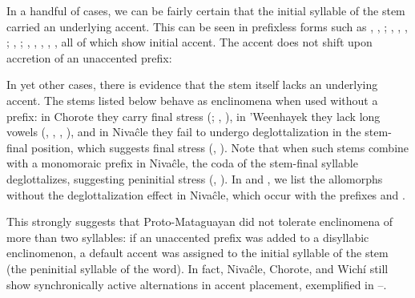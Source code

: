 In a handful of cases, we can be fairly certain that the initial syllable of the stem carried an underlying accent. This can be seen in prefixless forms such as , , ; , , , ; , ; , , , , , all of which show initial accent. The accent does not shift upon accretion of an unaccented prefix:

\begin{exe}
    \ex \rootn
    \ex \bow
    \ex \pathn
    \ex \beard
    \ex \smoke
\end{exe}

In yet other cases, there is evidence that the stem itself lacks an underlying accent. The stems listed below behave as enclinomena when used without a prefix: in Chorote they carry final stress (; , ), in 'Weenhayek they lack long vowels (, , , ), and in Nivaĉle they fail to undergo deglottalization in the stem-final position, which suggests final stress (, ). Note that when such stems combine with a monomoraic prefix in Nivaĉle, the coda of the stem-final syllable deglottalizes, suggesting peninitial stress (, ). In  and , we list the allomorphs without the deglottalization effect in Nivaĉle, which occur with the prefixes  and .

\begin{exe}
    \ex \coalrel \label{encl-coal}
    \ex \holerel
    \ex \kojarel
    \ex \oldnrel
    \ex \medicine
    \ex \abdcavity \label{encl-abd}
\end{exe}

This strongly suggests that Proto-Mataguayan did not tolerate enclinomena of more than two syllables: if an unaccented prefix was added to a disyllabic enclinomenon, a default accent was assigned to the initial syllable of the stem (the peninitial syllable of the word). In fact, Nivaĉle, Chorote, and Wichí still show synchronically active alternations in accent placement, exemplified in –.

